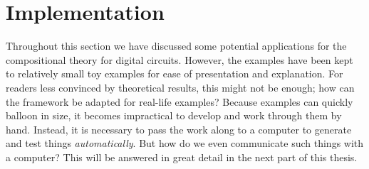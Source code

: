 \section{Implementation}

Throughout this section we have discussed some potential applications for the
compositional theory for digital circuits.
However, the examples have been kept to relatively small toy examples for
ease of presentation and explanation.
For readers less convinced by theoretical results, this might not be enough; how
can the framework be adapted for real-life examples?
Because examples can quickly balloon in size, it becomes impractical to develop
and work through them by hand.
Instead, it is necessary to pass the work along to a computer to generate and
test things \emph{automatically}.
But how do we even communicate such things with a computer?
This will be answered in great detail in the next part of this thesis.